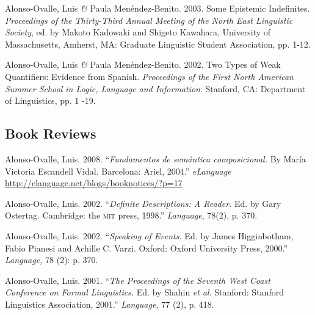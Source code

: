 \documentclass[11pt]{article}
\begin{document}
Alonso-Ovalle, Luis \textit{\&} Paula Men\'endez-Benito. 2003. Some Epistemic Indefinites. \textit{Proceedings of the Thirty-Third Annual Meeting of the North East Linguistic Society}, ed. by Makoto Kadowaki and Shigeto Kawahara,  University of Massachusetts, Amherst, MA: Graduate Linguistic Student Association, pp. 1-12. 


Alonso-Ovalle, Luis \textit{\&} Paula Men\'endez-Benito. 2002. Two Types of Weak Quantifiers: Evidence from Spanish. \textit{Proceedings of the First North American Summer School in Logic, Language and Information}. Stanford, CA: Department of Linguistics, pp. 1 -19. 



\subsection*{Book Reviews}
Alonso-Ovalle, Luis. 2008. ``\textit{Fundamentos de sem\'antica composicional.} By Mar\'ia Victoria Escandell Vidal. Barcelona: Ariel, 2004.''  \textit{eLanguage} {\footnotesize \href{http://elanguage.net/blogs/booknotices/?p=17}{http://elanguage.net/blogs/booknotices/?p=17}}

Alonso-Ovalle, Luis. 2002. ``\textit{Definite Descriptions: A Reader.} Ed. by Gary Ostertag. Cambridge: the \textsc{mit} press, 1998.''  \textit{Language}, 78(2), p. 370.

Alonso-Ovalle, Luis. 2002. ``\textit{Speaking of Events.} Ed. by James Higginbotham, Fabio Pianesi and Achille C. Varzi. Oxford: Oxford University Press, 2000.'' \textit{Language,} 78 (2): p. 370.

Alonso-Ovalle, Luis. 2001. ``\textit{The Proceedings of the Seventh West Coast Conference on Formal Linguistics.} Ed. by Shahin \textit{et al}. Stanford: Stanford Linguistics Association, 2001.'' {\it Language,} 77 (2), p. 418.
\end{document}
